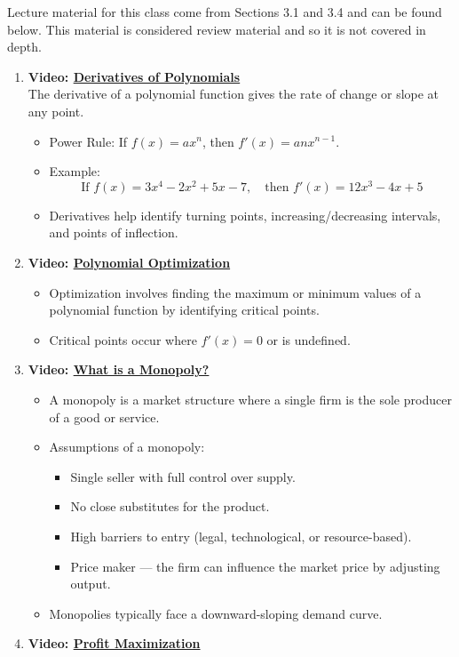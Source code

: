 \documentclass[
]{book}
\providecommand{\tightlist}{%
  \setlength{\itemsep}{0pt}\setlength{\parskip}{0pt}}
\begin{document}
Lecture material for this class come from Sections 3.1 and 3.4 and can be found below. This material is considered review material and so it is not covered in depth.

\begin{enumerate}
\def\labelenumi{\arabic{enumi}.}
\tightlist
\item
  \textbf{Video: \href{https://www.youtube.com/watch?v=8Sv6CNuNwqo}{Derivatives of Polynomials}}\\
  The derivative of a polynomial function gives the rate of change or slope at any point.

  \begin{itemize}
  \tightlist
  \item
    Power Rule: If \(f(x) = ax^n\), then \(f'(x) = anx^{n-1}\).
  \item
    Example:\\
    \[
       \text{If } f(x) = 3x^4 - 2x^2 + 5x - 7, \quad \text{then } f'(x) = 12x^3 - 4x + 5
       \]
  \item
    Derivatives help identify turning points, increasing/decreasing intervals, and points of inflection.
  \end{itemize}
\item
  \textbf{Video: \href{https://www.youtube.com/watch?v=y9M6kmgSnw8}{Polynomial Optimization}}

  \begin{itemize}
  \tightlist
  \item
    Optimization involves finding the maximum or minimum values of a polynomial function by identifying critical points.
  \item
    Critical points occur where \(f'(x) = 0\) or is undefined.
  \end{itemize}
\item
  \textbf{Video: \href{https://www.youtube.com/watch?v=146O2tCFBWs}{What is a Monopoly?}}

  \begin{itemize}
  \tightlist
  \item
    A monopoly is a market structure where a single firm is the sole producer of a good or service.
  \item
    Assumptions of a monopoly:

    \begin{itemize}
    \tightlist
    \item
      Single seller with full control over supply.
    \item
      No close substitutes for the product.
    \item
      High barriers to entry (legal, technological, or resource-based).
    \item
      Price maker --- the firm can influence the market price by adjusting output.
    \end{itemize}
  \item
    Monopolies typically face a downward-sloping demand curve.
  \end{itemize}
\item
  \textbf{Video: \href{https://www.youtube.com/watch?v=Qk8QdpJovfs}{Profit Maximization}}


\end{enumerate}
\end{document}
